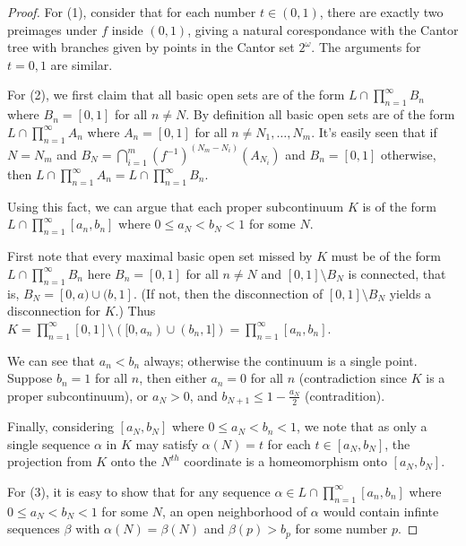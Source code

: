 \begin{proof}
For (1), consider that for each number $t\in(0,1)$, there are exactly two preimages under $f$ inside $(0,1)$, giving a natural corespondance with the Cantor tree with branches given by points in the Cantor set $2^\omega$. The arguments for $t=0,1$ are similar.

For (2), we first claim that all basic open sets are of the form $L\cap\prod_{n=1}^\infty B_n$ where $B_n=[0,1]$ for all $n\not=N$. By definition all basic open sets are of the form $L\cap\prod_{n=1}^\infty A_n$ where $A_n=[0,1]$ for all $n\not=N_1,\dots,N_m$. It's easily seen that if $N=N_m$ and $B_N = \bigcap_{i=1}^m (f^{-1})^{(N_m-N_i)}(A_{N_i})$ and $B_n=[0,1]$ otherwise, then $L\cap\prod_{n=1}^\infty A_n = L\cap\prod_{n=1}^\infty B_n$.

Using this fact, we can argue that each proper subcontinuum $K$ is of the form $L \cap \prod_{n=1}^\infty [a_n,b_n]$ where $0\leq a_N < b_N < 1$ for some $N$. 

First note that every maximal basic open set missed by $K$ must be of the form $L\cap\prod_{n=1}^\infty B_n$ here $B_n=[0,1]$ for all $n\not=N$ and $[0,1] \setminus B_N$ is connected, that is, $B_N=[0,a)\cup(b,1]$. (If not, then the disconnection of $[0,1]\setminus B_N$ yields a disconnection for $K$.) Thus $K = \prod_{n=1}^\infty [0,1]\setminus ([0,a_n)\cup(b_n,1]) = \prod_{n=1}^\infty [a_n,b_n]$.

We can see that $a_n<b_n$ always; otherwise the continuum is a single point. Suppose $b_n = 1$ for all $n$, then either $a_n=0$ for all $n$ (contradiction since $K$ is a proper subcontinuum), or $a_N>0$, and $b_{N+1}\leq 1-\frac{a_N}{2}$ (contradition).

Finally, considering $[a_N,b_N]$ where $0\leq a_N<b_n<1$, we note that as only a single sequence $\alpha$ in $K$ may satisfy $\alpha(N)=t$ for each $t\in [a_N,b_N]$, the projection from $K$ onto the $N^{th}$ coordinate is a homeomorphism onto $[a_N,b_N]$.

For (3), it is easy to show that for any sequence $\alpha\in L \cap \prod_{n=1}^\infty [a_n,b_n]$ where $0\leq a_N < b_N < 1$ for some $N$, an open neighborhood of $\alpha$ would contain infinte sequences $\beta$ with $\alpha(N)=\beta(N)$ and $\beta(p)>b_p$ for some number $p$.

\end{proof}

